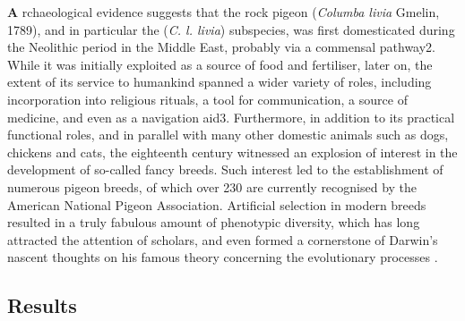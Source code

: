 \documentclass[a4paper]{article}
\begin{document}
\newpage


\begin{multicols}{2}
\lettrine[findent=2pt]{\textbf{A}}{ }rchaeological evidence suggests that the rock pigeon (\textit{Columba livia} Gmelin, 1789), and in particular the (\textit{C. l. livia}) subspecies, was first domesticated during the Neolithic period in the Middle East, probably via a commensal pathway2. While it was initially exploited as a source of food and fertiliser, later on, the extent of its service to humankind spanned a wider variety of roles, including incorporation into religious rituals, a tool for communication, a source of medicine, and even as a navigation aid3. Furthermore, in addition to its practical functional roles, and in parallel with many other domestic animals such as dogs, chickens and cats, the eighteenth century witnessed an explosion of interest in the development of so-called fancy breeds. Such interest led to the establishment of numerous pigeon breeds, of which over 230 are currently recognised by the American National Pigeon Association. Artificial selection in modern breeds resulted in a truly fabulous amount of phenotypic diversity, which has long attracted the attention of scholars, and even formed a cornerstone of Darwin’s nascent thoughts on his famous theory concerning the evolutionary processes \cite{pacheco_darwins_2020}.\
\end{multicols}



\subsection*{Results}

\end{document}
